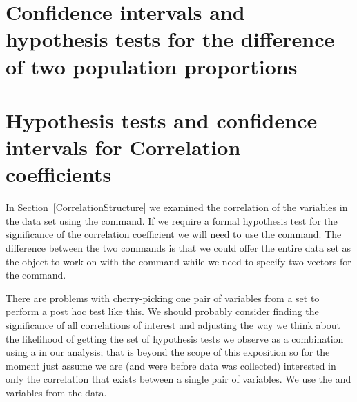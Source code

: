 \section{Confidence intervals and hypothesis tests for the difference of two population proportions} 
 
\section{Hypothesis tests and confidence intervals for Correlation coefficients} 
 
In Section~\ref{CorrelationStructure} 
we examined the correlation of the variables in the  data set using the  command.  
If we require a formal hypothesis test for the significance of the correlation coefficient we will need to use the  command. The difference between the two commands is that we could offer the entire data set as the object to work on with the  command while we need to specify two vectors for the  command. 
 
There are problems with cherry-picking one pair of variables from a set to perform a post hoc test like this. We should probably consider finding the significance of all correlations of interest and adjusting the way we think about the likelihood of getting the set of hypothesis tests we observe as a combination using a  in our analysis; that is beyond the scope of this exposition so for the moment just assume we are (and were before data was collected) interested in only the correlation that exists between a single pair of variables. We use the  and  variables from the  data. 
 
